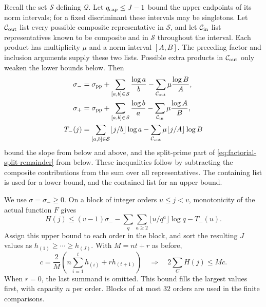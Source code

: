 Recall the set $\mathcal S$ defining $\mathcal Q$. Let
$q_{\rm cap}\leq J-1$ bound the upper endpoints of its norm intervals;
for a fixed discriminant these intervals may be singletons.
Let $\mathcal C_{\rm out}$ list every possible composite representative
in $\mathcal S$, and let $\mathcal C_{\rm in}$ list representatives known
to be composite and in $\mathcal S$ throughout the interval.
Each product has multiplicity $\mu$ and a norm interval $[A,B]$.
The preceding factor and inclusion arguments supply these two lists.
Possible extra products in $\mathcal C_{\rm out}$ only weaken the lower
bounds below. Then
\begin{align}
 \sigma_-&=\sigma_{\rm pp}+\sum_{[a,b]\in\mathcal S}\frac{\log a}{b}
                 -\sum_{\mathcal C_{\rm out}}\mu\frac{\log B}{A},
 \label{eq:slope-lower}\\
 \sigma_+&=\sigma_{\rm pp}+\sum_{[a,b]\in\mathcal S}\frac{\log b}{a}
                 -\sum_{\mathcal C_{\rm in}}\mu\frac{\log A}{B},
 \label{eq:slope-upper}\\
 T_-(j)&=\sum_{[a,b]\in\mathcal S}\lfloor j/b\rfloor\log a
                 -\sum_{\mathcal C_{\rm out}}\mu\lfloor j/A\rfloor\log B
 \label{eq:split-floor-lower}
\end{align}
bound the slope from below and above, and the split-prime part of
\eqref{eq:factorial-split-remainder} from below. These inequalities follow
by subtracting the composite contributions from the sum over all
representatives. The containing list is used for a lower bound, and the
contained list for an upper bound.

We use $\sigma=\sigma_-\geq0$. On a block of integer orders
$u\leq j<v$, monotonicity of the actual function $F$ gives
\begin{equation}\label{eq:remainder-block}
 H(j)\leq(v-1)\sigma_-
       -\sum_q\sum_{a\geq2}\lfloor u/q^a\rfloor\log q-T_-(u).
\end{equation}
Assign this upper bound to each order in the block, and sort the resulting
$J$ values as $h_{(1)}\geq\cdots\geq h_{(J)}$. With $M=nt+r$ as before,
\begin{equation}\label{eq:finite-column-constant}
 c=\frac2M\left(n\sum_{i=1}^t h_{(i)}+rh_{(t+1)}\right)
 \quad\Longrightarrow\quad 2\sum_C H(j)\leq Mc.
\end{equation}
When $r=0$, the last summand is omitted. This bound fills the largest
values first, with capacity $n$ per order. Blocks of at most $32$ orders
are used in the finite comparisons.

